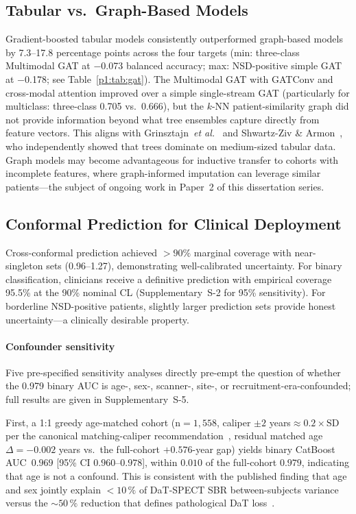 \subsection{Tabular vs.\ Graph-Based Models}
Gradient-boosted tabular models consistently outperformed graph-based models by 7.3--17.8 percentage points across the four targets (min: three-class Multimodal GAT at $-$0.073 balanced accuracy; max: NSD-positive simple GAT at $-$0.178; see Table~\ref{p1:tab:gat}). The Multimodal GAT with GATConv and cross-modal attention improved over a simple single-stream GAT (particularly for multiclass: three-class 0.705 vs.\ 0.666), but the $k$-NN patient-similarity graph did not provide information beyond what tree ensembles capture directly from feature vectors. This aligns with Grinsztajn~\textit{et al.}~\cite{grinsztajn2022} and Shwartz-Ziv \& Armon~\cite{shwartzziv2022}, who independently showed that trees dominate on medium-sized tabular data. Graph models may become advantageous for inductive transfer to cohorts with incomplete features, where graph-informed imputation can leverage similar patients---the subject of ongoing work in Paper~2 of this dissertation series.

\subsection{Conformal Prediction for Clinical Deployment}
Cross-conformal prediction achieved ${>}90\%$ marginal coverage with near-singleton sets (0.96--1.27), demonstrating well-calibrated uncertainty. For binary classification, clinicians receive a definitive prediction with empirical coverage 95.5\% at the 90\% nominal CL (Supplementary~S-2 for 95\% sensitivity). For borderline NSD-positive patients, slightly larger prediction sets provide honest uncertainty---a clinically desirable property.

\paragraph*{Confounder sensitivity}
\label{p1:sec:discussion:confounders}
Five pre-specified sensitivity analyses directly pre-empt the question of whether the 0.979 binary AUC is age-, sex-, scanner-, site-, or recruitment-era-confounded; full results are given in Supplementary~S-5.

First, a 1:1 greedy age-matched cohort (n${=}1{,}558$, caliper $\pm 2$ years${\approx}0.2{\times}\mathrm{SD}$ per the canonical matching-caliper recommendation~\cite{austin2011caliper}, residual matched age~$\Delta{=}{-}0.002$ years vs.\ the full-cohort $+0.576$-year gap) yields binary CatBoost AUC~$0.969$ [95\% CI $0.960$--$0.978$], within $0.010$ of the full-cohort $0.979$, indicating that age is not a confound. This is consistent with the published finding that age and sex jointly explain $<\!10\,\%$ of DaT-SPECT SBR between-subjects variance versus the ${\sim}50\,\%$ reduction that defines pathological DaT loss~\cite{schmitzSteinkruger2021age,eusebi2017dat}.

